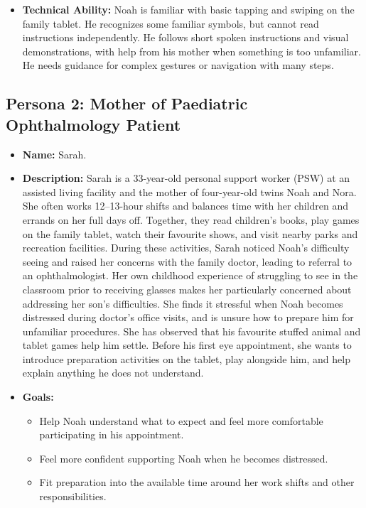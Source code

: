 \documentclass[10pt]{article}
\begin{document}
\begin{itemize}
\item \textbf{Technical Ability:} Noah is familiar with basic tapping and
swiping on the family tablet. He recognizes some familiar symbols, but cannot read instructions independently.
He follows short spoken instructions and visual demonstrations, with help
from his mother when something is too unfamiliar. He needs guidance for
complex gestures or navigation with many steps.
\end{itemize}

\subsection{Persona 2: Mother of Paediatric Ophthalmology Patient}
\begin{itemize}
\item \textbf{Name:} Sarah.

\item \textbf{Description:} Sarah is a 33-year-old personal support worker
(PSW) at an assisted living facility and the mother of four-year-old twins
Noah and Nora. She often works 12--13-hour shifts and balances time with her
children and errands on her full days off. Together, they read children's
books, play games on the family tablet, watch their favourite shows, and visit
nearby parks and recreation facilities. During these activities, Sarah
noticed Noah's difficulty seeing and raised her concerns with the family
doctor, leading to referral to an ophthalmologist. Her own childhood
experience of struggling to see in the classroom prior to receiving glasses
makes her particularly concerned about addressing her son's difficulties.
She finds it stressful when Noah becomes distressed during doctor's office visits,
and is unsure how to prepare him for unfamiliar procedures. She has observed
that his favourite stuffed animal and tablet games help him settle.
Before his first eye appointment, she wants to introduce preparation
activities on the tablet, play alongside him, and help
explain anything he does not understand.

\item \textbf{Goals:}
\begin{itemize}
    \item Help Noah understand what to expect and feel more comfortable
    participating in his appointment.
    \item Feel more confident supporting Noah when he becomes distressed.
    \item Fit preparation into the available time around her work shifts and other responsibilities.
\end{itemize}


\end{itemize}
\end{document}
